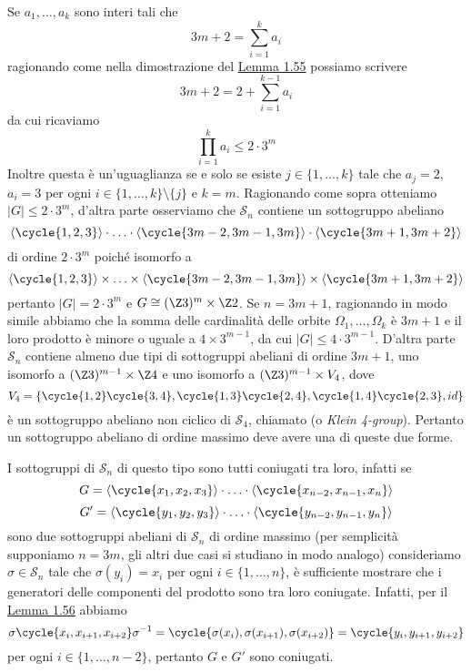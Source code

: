 \documentclass[11pt]{scrartcl}
\begin{document}
	\begin{remark}
		Se $a_1, \ldots, a_k$ sono interi tali che 
		\[
		3m + 2 = \sum_{i = 1}^k a_i
		\]
		ragionando come nella dimostrazione del \hyperref[lemma1.55]{Lemma 1.55}
		possiamo scrivere
		\[
		3m + 2 = 2 + \sum_{i = 1}^{k - 1}a_i
		\]
		da cui ricaviamo
		\[
		\prod_{i = 1}^k a_i \leqslant 2\cdot3^m
		\]
		Inoltre questa è un'uguaglianza se e solo se esiste $j \in \{1, \ldots, k\}$
		tale che $a_j = 2$, $a_i = 3$ per ogni $i \in \{1, \ldots, k\}\setminus\{j\}$
		e $k = m$. Ragionando come sopra otteniamo $|G| \leqslant 2\cdot 3^m$, 
		d'altra parte osserviamo che $\mathcal{S}_n$ contiene un sottogruppo abeliano
		\[
		\langle\cycle{1, 2, 3}\rangle\cdot\ldots\cdot\langle\cycle{3m - 2, 3m - 1, 3m}\rangle\cdot\langle\cycle{3m + 1, 3m + 2}\rangle
		\]
		di ordine $2\cdot3^m$ poiché isomorfo a 
		\[
		\langle\cycle{1, 2, 3}\rangle\times\ldots\times\langle\cycle{3m - 2, 3m - 1, 3m}\rangle\times\langle\cycle{3m + 1, 3m + 2}\rangle
		\]
		pertanto $|G| = 2\cdot3^m$ e $G \cong (\Z3)^m \times \Z2$.
		Se $n = 3m + 1$, ragionando in modo simile abbiamo che la somma delle
		cardinalità delle orbite $\Omega_1, \ldots, \Omega_k$ è $3m + 1$ e il 
		loro prodotto è minore o uguale a $4\times 3^{m - 1}$, da cui $|G| \leq
		4\cdot3^{m - 1}$. D'altra parte $\mathcal{S}_n$ contiene almeno due tipi di 
		sottogruppi abeliani di ordine $3m + 1$, uno isomorfo a 
		$(\Z3)^{m - 1} \times \Z4$ e uno isomorfo a $(\Z3)^{m - 1}\times V_4$,
		dove 
		\[
		V_4 = \{\cycle{1, 2}\cycle{3, 4}, \cycle{1, 3}\cycle{2, 4}, 
		\cycle{1, 4}\cycle{2, 3}, id\}
		\]
		è un sottogruppo abeliano non ciclico di $\mathcal{S}_4$, chiamato 
		 (o \textit{Klein 4-group}). Pertanto un sottogruppo
		abeliano di ordine massimo deve avere una di queste due forme.
	\end{remark}
	
	\begin{remark}
		I sottogruppi di $\mathcal{S}_n$ di questo tipo sono tutti coniugati tra loro, infatti
		se 
		\[
		G = \langle\cycle{x_1, x_2, x_3}\rangle\cdot\ldots\cdot\langle\cycle{x_{n - 2}, x_{n - 1}, x_n}\rangle
		\]
		\[
		G' = \langle\cycle{y_1, y_2, y_3}\rangle\cdot\ldots\cdot\langle\cycle{y_{n - 2}, y_{n - 1}, y_n}\rangle
		\]
		sono due sottogruppi abeliani di $\mathcal{S}_n$ di ordine massimo (per semplicità
		supponiamo $n = 3m$, gli altri due casi si studiano in modo analogo)
		consideriamo $\sigma \in \mathcal{S}_n$ tale che $\sigma(y_i) = x_i$ per ogni 
		$i \in \{1, \ldots, n\}$, è sufficiente mostrare che i generatori delle componenti del
		prodotto sono tra loro coniugate. Infatti, per il \hyperref[lemma1.56]{Lemma 1.56}
		abbiamo 
		\[
		\sigma\cycle{x_i, x_{i + 1}, x_{i + 2}}\sigma^{-1} = 
		\cycle{\sigma(x_i), \sigma(x_{i + 1}), \sigma(x_{i + 2})} = 
		\cycle{y_i, y_{i + 1}, y_{i + 2}}
		\]
		per ogni $i \in \{1, \ldots, n - 2\}$, pertanto $G$ e $G'$ sono coniugati.
	\end{remark}
	
\end{document}
